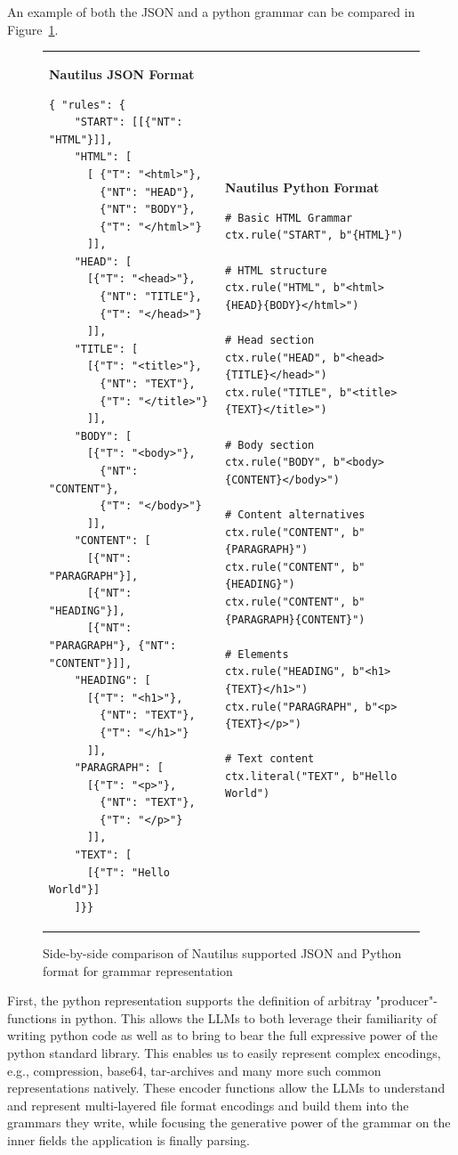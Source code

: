 An example of both the JSON and a python grammar can be compared in Figure~\ref{fig:grammar-format-comparison}.
%
\begin{figure}
\centering
\begin{tabular}{@{}p{}@{\hskip 15pt}p{}@{}}
%
\textbf{Nautilus JSON Format}
\begin{verbatim}
{ "rules": {
    "START": [[{"NT": "HTML"}]],
    "HTML": [
      [ {"T": "<html>"},
        {"NT": "HEAD"},
        {"NT": "BODY"},
        {"T": "</html>"}
      ]],
    "HEAD": [
      [{"T": "<head>"},
        {"NT": "TITLE"},
        {"T": "</head>"}
      ]],
    "TITLE": [
      [{"T": "<title>"},
        {"NT": "TEXT"},
        {"T": "</title>"}
      ]],
    "BODY": [
      [{"T": "<body>"},
        {"NT": "CONTENT"},
        {"T": "</body>"}
      ]],
    "CONTENT": [
      [{"NT": "PARAGRAPH"}],
      [{"NT": "HEADING"}],
      [{"NT": "PARAGRAPH"}, {"NT": "CONTENT"}]],
    "HEADING": [
      [{"T": "<h1>"},
        {"NT": "TEXT"},
        {"T": "</h1>"}
      ]],
    "PARAGRAPH": [
      [{"T": "<p>"},
        {"NT": "TEXT"},
        {"T": "</p>"}
      ]],
    "TEXT": [
      [{"T": "Hello World"}]
    ]}}
\end{verbatim}
%
&
\textbf{Nautilus Python Format}
\begin{verbatim}
# Basic HTML Grammar
ctx.rule("START", b"{HTML}")

# HTML structure
ctx.rule("HTML", b"<html>{HEAD}{BODY}</html>")

# Head section
ctx.rule("HEAD", b"<head>{TITLE}</head>")
ctx.rule("TITLE", b"<title>{TEXT}</title>")

# Body section
ctx.rule("BODY", b"<body>{CONTENT}</body>")

# Content alternatives
ctx.rule("CONTENT", b"{PARAGRAPH}")
ctx.rule("CONTENT", b"{HEADING}")
ctx.rule("CONTENT", b"{PARAGRAPH}{CONTENT}")

# Elements
ctx.rule("HEADING", b"<h1>{TEXT}</h1>")
ctx.rule("PARAGRAPH", b"<p>{TEXT}</p>")

# Text content
ctx.literal("TEXT", b"Hello World")
\end{verbatim}
%
\end{tabular}
\caption{Side-by-side comparison of Nautilus supported JSON and Python format for grammar representation}
\label{fig:grammar-format-comparison}
\end{figure}
%
First, the python representation supports the definition of arbitray "producer"-functions in python. This allows the LLMs to both leverage their familiarity of writing python code as well as to bring to bear the full expressive power of the python standard library.
This enables us to easily represent complex encodings, e.g., compression, base64, tar-archives and many more such common representations natively.
These encoder functions allow the LLMs to understand and represent multi-layered file format encodings and build them into the grammars they write, while focusing the generative power of the grammar on the inner fields the application is finally parsing.

